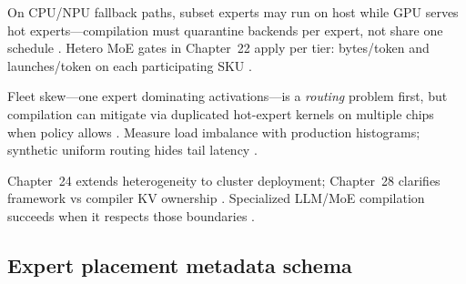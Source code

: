 On CPU/NPU fallback paths, subset experts may run on host while GPU serves hot experts---compilation must quarantine backends per expert, not share one schedule \citep{amd2024xdna,amd2024aie,dlbook,chen2020compilerbasedhardw,yirage2026,patel2025llminference,kwon2023vllm,liu2024deepseekv3,taxbreak2026,memoryfloor2026,semianalysis2024tma,dao2022flashattention,dao2023flashdecoding,nvidia2024cudagraphs,nvidia2022hopper}. Hetero MoE gates in Chapter~22 apply per tier: bytes/token and launches/token on each participating SKU \citep{chen2020compilerbasedhardw,yirage2026,patel2025llminference,memoryfloor2026,taxbreak2026,kwon2023vllm,liu2024deepseekv3,amd2024aie,dlbook,semianalysis2024tma,amd2024xdna,dao2022flashattention,dao2023flashdecoding,nvidia2024cudagraphs,nvidia2022hopper}.

Fleet skew---one expert dominating activations---is a \emph{routing} problem first, but compilation can mitigate via duplicated hot-expert kernels on multiple chips when policy allows \citep{liu2024deepseekv3,patel2025llminference,yirage2026,chen2020compilerbasedhardw,kwon2023vllm,taxbreak2026,memoryfloor2026,amd2024aie,dlbook,semianalysis2024tma,amd2024xdna,dao2022flashattention,dao2023flashdecoding,nvidia2024cudagraphs,nvidia2022hopper}. Measure load imbalance with production histograms; synthetic uniform routing hides tail latency \citep{patel2025llminference,liu2024deepseekv3,yirage2026,chen2020compilerbasedhardw,kwon2023vllm,taxbreak2026,memoryfloor2026,amd2024aie,dlbook,semianalysis2024tma,amd2024xdna,dao2022flashattention,dao2023flashdecoding,nvidia2024cudagraphs,nvidia2022hopper}.

Chapter~24 extends heterogeneity to cluster deployment; Chapter~28 clarifies framework vs compiler KV ownership \citep{chen2020compilerbasedhardw,yirage2026,patel2025llminference,kwon2023vllm,liu2024deepseekv3,memoryfloor2026,taxbreak2026,amd2024aie,dlbook,semianalysis2024tma,amd2024xdna,dao2022flashattention,dao2023flashdecoding,nvidia2024cudagraphs,nvidia2022hopper}. Specialized LLM/MoE compilation succeeds when it respects those boundaries \citep{yirage2026,chen2020compilerbasedhardw,patel2025llminference,kwon2023vllm,liu2024deepseekv3,memoryfloor2026,taxbreak2026,amd2024aie,dlbook,semianalysis2024tma,amd2024xdna,dao2022flashattention,dao2023flashdecoding,nvidia2024cudagraphs,nvidia2022hopper}.

\subsection{Expert placement metadata schema}

